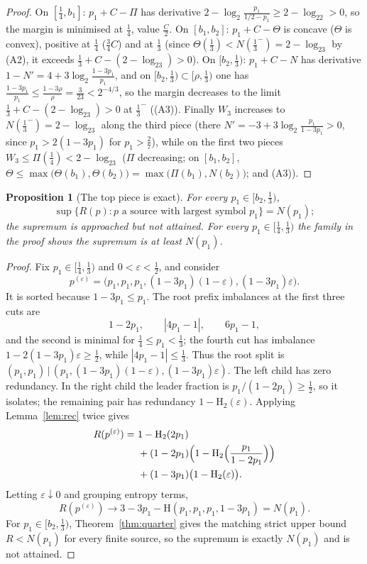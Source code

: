 \documentclass[journal]{IEEEtran}
\newtheorem{proposition}{Proposition}
\theoremstyle{definition}
\newcommand{\Hh}{\mathrm H_2}
\newcommand{\lgg}{\log_2}
\newcommand{\CC}{C}
\begin{document}
\begin{proof}
On $[\tfrac14,b_1]$: $p_1+\CC-\Pi$ has derivative
$2-\lgg\tfrac{p_1}{1/2-p_1}\ge2-\lgg2>0$, so the margin is minimised at
$\tfrac14$, value $\tfrac{\CC}2$. On $[b_1,b_2]$: $p_1+\CC-\Theta$ is
concave \textup{(}$\Theta$ is convex\textup{)}, positive at $\tfrac14$
\textup{(}$\tfrac34\CC$\textup{)} and at $\tfrac13$ \textup{(}since
$\Theta(\tfrac13)<N(\tfrac13^-)=2-\lgg3$ by \textup{(A2)}, it exceeds
$\tfrac13+\CC-(2-\lgg3)>0$\textup{)}. On $[b_2,\tfrac13)$: $p_1+\CC-N$ has
derivative $1-N'=4+3\lgg\tfrac{1-3p_1}{p_1}$, and on
$[b_2,\tfrac13)\subset[\rho,\tfrac13)$ one has
$\tfrac{1-3p_1}{p_1}\le\tfrac{1-3\rho}{\rho}=\tfrac3{23}<2^{-4/3}$, so the margin
decreases to the limit $\tfrac13+\CC-(2-\lgg3)>0$ at $\tfrac13^-$
\textup{(}\textup{(A3)}\textup{)}. Finally $W_3$ increases to
$N(\tfrac13^-)=2-\lgg3$ along the third piece \textup{(}there
$N'=-3+3\lgg\tfrac{p_1}{1-3p_1}>0$, since $p_1>2(1-3p_1)$ for
$p_1>\tfrac27$\textup{)}, while on the first two pieces
$W_3\le\Pi(\tfrac14)<2-\lgg3$ \textup{(}$\Pi$ decreasing; on $[b_1,b_2]$,
$\Theta\le\max\bigl(\Theta(b_1),\Theta(b_2)\bigr)
=\max\bigl(\Pi(b_1),N(b_2)\bigr)$; and \textup{(A3)}\textup{)}.
\end{proof}

\begin{proposition}[The top piece is exact]\label{prop:tight-q}
For every $p_1\in[b_2,\tfrac13)$,
\[
  \sup\{R(p): p\text{ a source with largest symbol }p_1\}=N(p_1);
\]
the supremum is approached but not attained. For every
$p_1\in[\tfrac14,\tfrac13)$ the family in the proof shows the supremum is at
least $N(p_1)$.
\end{proposition}

\begin{proof}
Fix $p_1\in[\tfrac14,\tfrac13)$ and $0<\varepsilon<\tfrac12$, and consider
\[
  p^{(\varepsilon)}
  =\bigl(p_1,p_1,p_1,(1-3p_1)(1-\varepsilon),(1-3p_1)\varepsilon\bigr).
\]
It is sorted because $1-3p_1\le p_1$. The root prefix imbalances at the first
three cuts are
\[
  1-2p_1,\qquad |4p_1-1|,\qquad 6p_1-1,
\]
and the second is minimal for $\tfrac14\le p_1<\tfrac13$; the fourth cut has
imbalance $1-2(1-3p_1)\varepsilon\ge\tfrac12$, while
$|4p_1-1|\le\tfrac13$. Thus the root split is
$(p_1,p_1)\,|\,(p_1,(1-3p_1)(1-\varepsilon),(1-3p_1)\varepsilon)$. The left
child has zero redundancy. In the right child the leader fraction is
$p_1/(1-2p_1)\ge\tfrac12$, so it isolates; the remaining pair has redundancy
$1-\Hh(\varepsilon)$. Applying Lemma~\ref{lem:rec} twice gives
\[
\begin{aligned}
  R(p^{(\varepsilon)})
  =\ &1-\Hh(2p_1)\\
  &+(1-2p_1)\Bigl(1-\Hh\Bigl(\frac{p_1}{1-2p_1}\Bigr)\Bigr)\\
  &+(1-3p_1)\bigl(1-\Hh(\varepsilon)\bigr).
\end{aligned}
\]
Letting $\varepsilon\downarrow0$ and grouping entropy terms,
\[
  R(p^{(\varepsilon)})\longrightarrow
  3-3p_1-\mathrm H(p_1,p_1,p_1,1-3p_1)=N(p_1).
\]
For $p_1\in[b_2,\tfrac13)$, Theorem~\ref{thm:quarter} gives the matching
strict upper bound $R<N(p_1)$ for every finite source, so the supremum is
exactly $N(p_1)$ and is not attained.
\end{proof}
\end{document}
